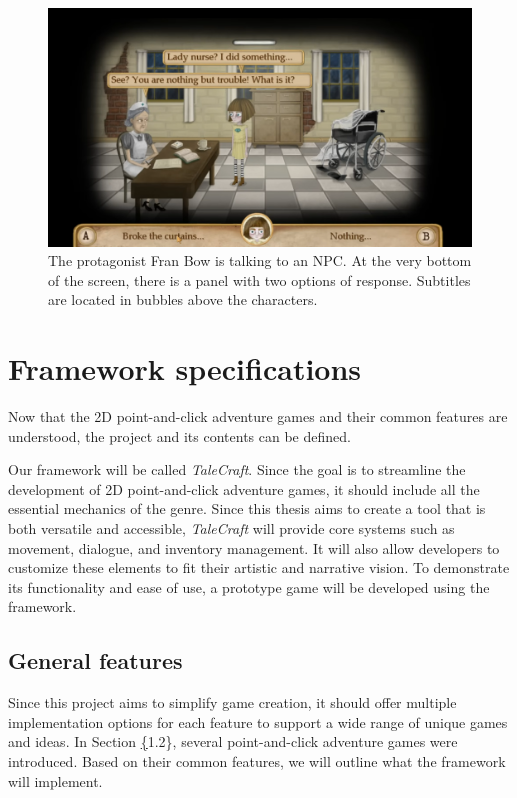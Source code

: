 \begin{figure}[H]
\centering
\includegraphics[width=.8\linewidth]{img/D-FB.png}
\caption{The protagonist Fran Bow is talking to an NPC. At the very bottom of the screen, there is a panel with two options of response. Subtitles are located in bubbles above the characters.}
\label{fig:D-FranBow}
\end{figure}

\section{Framework specifications}
Now that the 2D point-and-click adventure games and their common features are understood, the project and its contents can be defined. 

Our framework will be called \textit{TaleCraft}. Since the goal is to streamline the development of 2D point-and-click adventure games, it should include all the essential mechanics of the genre. Since this thesis aims to create a tool that is both versatile and accessible, \textit{TaleCraft} will provide core systems such as movement, dialogue, and inventory management. It will also allow developers to customize these elements to fit their artistic and narrative vision. To demonstrate its functionality and ease of use, a prototype game will be developed using the framework. 

\subsection{General features}
Since this project aims to simplify game creation, it should offer multiple implementation options for each feature to support a wide range of unique games and ideas. In Section \hyperref[sec:Common features]\{1.2\}, several point-and-click adventure games were introduced. Based on their common features, we will outline what the framework will implement. 

